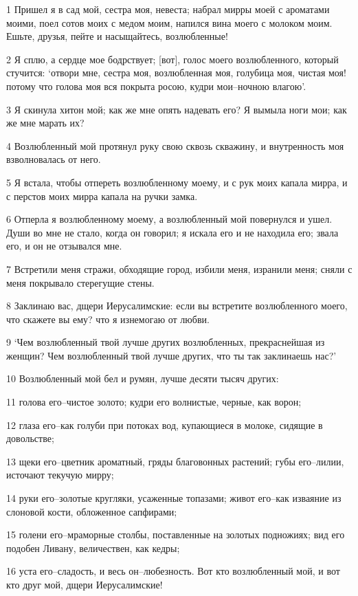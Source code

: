 \par 1 Пришел я в сад мой, сестра моя, невеста; набрал мирры моей с ароматами моими, поел сотов моих с медом моим, напился вина моего с молоком моим. Ешьте, друзья, пейте и насыщайтесь, возлюбленные!
\par 2 Я сплю, а сердце мое бодрствует; [вот], голос моего возлюбленного, который стучится: `отвори мне, сестра моя, возлюбленная моя, голубица моя, чистая моя! потому что голова моя вся покрыта росою, кудри мои--ночною влагою'.
\par 3 Я скинула хитон мой; как же мне опять надевать его? Я вымыла ноги мои; как же мне марать их?
\par 4 Возлюбленный мой протянул руку свою сквозь скважину, и внутренность моя взволновалась от него.
\par 5 Я встала, чтобы отпереть возлюбленному моему, и с рук моих капала мирра, и с перстов моих мирра капала на ручки замка.
\par 6 Отперла я возлюбленному моему, а возлюбленный мой повернулся и ушел. Души во мне не стало, когда он говорил; я искала его и не находила его; звала его, и он не отзывался мне.
\par 7 Встретили меня стражи, обходящие город, избили меня, изранили меня; сняли с меня покрывало стерегущие стены.
\par 8 Заклинаю вас, дщери Иерусалимские: если вы встретите возлюбленного моего, что скажете вы ему? что я изнемогаю от любви.
\par 9 `Чем возлюбленный твой лучше других возлюбленных, прекраснейшая из женщин? Чем возлюбленный твой лучше других, что ты так заклинаешь нас?'
\par 10 Возлюбленный мой бел и румян, лучше десяти тысяч других:
\par 11 голова его--чистое золото; кудри его волнистые, черные, как ворон;
\par 12 глаза его--как голуби при потоках вод, купающиеся в молоке, сидящие в довольстве;
\par 13 щеки его--цветник ароматный, гряды благовонных растений; губы его--лилии, источают текучую мирру;
\par 14 руки его--золотые кругляки, усаженные топазами; живот его--как изваяние из слоновой кости, обложенное сапфирами;
\par 15 голени его--мраморные столбы, поставленные на золотых подножиях; вид его подобен Ливану, величествен, как кедры;
\par 16 уста его--сладость, и весь он--любезность. Вот кто возлюбленный мой, и вот кто друг мой, дщери Иерусалимские!

